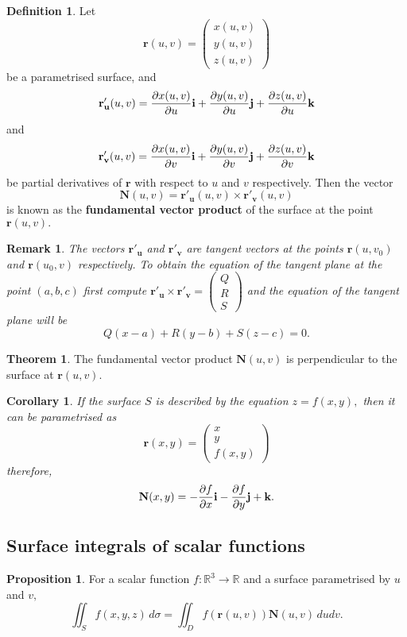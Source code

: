 \documentclass[12pt, a4paper]{article}
\newcommand{\bb}[1]{\mathbb{#1}}
\newcommand{\f}[2]{\frac{#1}{#2}}
\newcommand{\mb}[1]{\mathbf{#1}}
\newtheorem*{remark}{Remark}
\theoremstyle{definition}
\newtheorem{definition}{Definition}[section]
\newtheorem{theorem}{Theorem}[section]
\newtheorem{proposition}{Proposition}
\theoremstyle{plain}
\newtheorem{corollary}{Corollary}[theorem]
\begin{document}
\begin{definition}
Let $$\mb{r}(u,v) = \begin{pmatrix} x(u,v)\\y(u,v)\\z(u,v) \end{pmatrix}$$ be a parametrised surface, and $$\mb{r'_u}(u,v)= \pdv{x(u,v)}{u}\mb{i} + \pdv{y(u,v)}{u}\mb{j} +\pdv{z(u,v)}{u}\mb{k}$$ and $$\mb{r'_v}(u,v)=\pdv{x(u,v)}{v}\mb{i} + \pdv{y(u,v)}{v}\mb{j} +\pdv{z(u,v)}{v}\mb{k} $$ be partial derivatives of $\mb{r}$ with respect to $u$ and $v$ respectively. Then the vector $$\mb{N}(u,v)=\mb{r'_u}(u,v)\times \mb{r'_v}(u,v)$$ is known as the \textbf{fundamental vector product} of the surface at the point $\mb{r}(u,v).$
\end{definition}

\begin{remark}
The vectors $\mb{r'_u}$ and $\mb{r'_v}$ are tangent vectors at the points $\mb{r}(u,v_0)$ and $\mb{r}(u_0,v)$ respectively. To obtain the equation of the tangent plane at the point $(a,b,c)$ first compute $\mb{r'_u}\times \mb{r'_v} = \begin{pmatrix} Q \\ R \\ S \end{pmatrix}$ and the equation of the tangent plane will be $$Q(x-a)+R(y-b)+S(z-c)=0.$$
\end{remark}

\begin{theorem}
The fundamental vector product $\mb{N}(u,v)$ is perpendicular to the surface at $\mb{r}(u,v).$
\end{theorem}

\begin{corollary}
If the surface $S$ is described by the equation $z = f(x,y),$ then it can be parametrised as $$\mb{r}(x,y)=\begin{pmatrix} x\\y\\f(x,y) \end{pmatrix}$$ therefore, $$\mb{N}(x,y)=-\pdv{f}{x}\mb{i}-\pdv{f}{y}\mb{j}+\mb{k}.$$
\end{corollary}

\subsection{Surface integrals of scalar functions}

\begin{proposition}
For a scalar function $f:\bb{R}^3\to\bb{R}$ and a surface parametrised by $u$ and $v,$ $$\iint_S f(x,y,z) \, d\sigma =\iint_D f(\mb{r}(u,v))\mb{N}(u,v) \, dudv.$$
\end{proposition}
\end{document}
